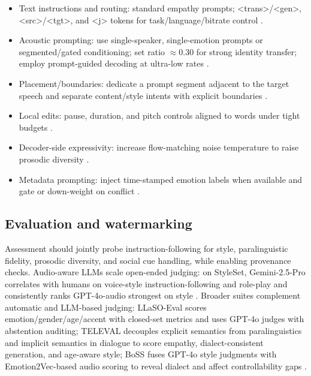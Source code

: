\documentclass{article}
\begin{document}
\begin{itemize}
\item Text instructions and routing: standard empathy prompts; <trans>/<gen>, <src>/<tgt>, and <j> tokens for task/language/bitrate control \cite{wang2024blspemotowardsempatheticlargespeechlangu,peng2024mslms2stmultitaskspeechlanguagemodeltext}.
\item Acoustic prompting: use single-speaker, single-emotion prompts or segmented/gated conditioning; set ratio $\approx$0.30 for strong identity transfer; employ prompt-guided decoding at ultra-low rates \cite{peng2024empiricalstudyspeechlanguagemodelsprompt,gong2024seamlessexpressivelmspeechlanguagemodele,wang2025tadicodectextawarediffusionspeechtokeniz}.
\item Placement/boundaries: dedicate a prompt segment adjacent to the target speech and separate content/style intents with explicit boundaries \cite{wu2024speechcomposerunifyingmultiplespeechtask}.
\item Local edits: pause, duration, and pitch controls aligned to words under tight budgets \cite{huang2023holisticcascadesystembenchmarkhumanevalu}.
\item Decoder-side expressivity: increase flow-matching noise temperature to raise prosodic diversity \cite{yuan2024continuousspeechtokensmakesllmsrobustmul}.
\item Metadata prompting: inject time-stamped emotion labels when available and gate or down-weight on conflict \cite{wang2025incorporatingcontextualparalinguisticund}.
\end{itemize}

\subsection{Evaluation and watermarking} \label{subsec:evaluationandwatermarking}
Assessment should jointly probe instruction-following for style, paralinguistic fidelity, prosodic diversity, and social cue handling, while enabling provenance checks. Audio-aware LLMs scale open-ended judging: on StyleSet, Gemini-2.5-Pro correlates with humans on voice-style instruction-following and role-play and consistently ranks GPT-4o-audio strongest on style \cite{chiang2025audioawarelargelanguagemodelsasjudgesspe}. Broader suites complement automatic and LLM-based judging: LLaSO-Eval scores emotion/gender/age/accent with closed-set metrics and uses GPT-4o judges with abstention auditing; TELEVAL decouples explicit semantics from paralinguistics and implicit semantics in dialogue to score empathy, dialect-consistent generation, and age-aware style; BoSS fuses GPT-4o style judgments with Emotion2Vec-based audio scoring to reveal dialect and affect controllability gaps \cite{sun2025llasofoundationalframeworkreproduciblere,li2025televaldynamicbenchmarkdesignedspokenlan,wang2025bossbeyondsemanticspeech}. 
\end{document}
